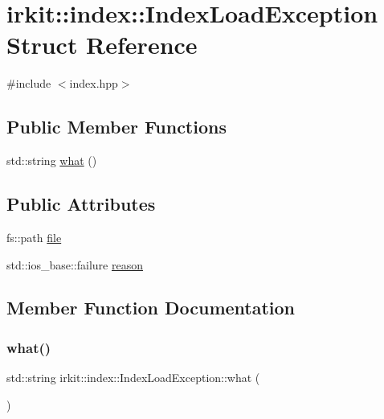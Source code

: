 \hypertarget{structirkit_1_1index_1_1IndexLoadException}{}\section{irkit\+:\+:index\+:\+:Index\+Load\+Exception Struct Reference}
\label{structirkit_1_1index_1_1IndexLoadException}


{\ttfamily \#include $<$index.\+hpp$>$}

\subsection*{Public Member Functions}
\begin{DoxyCompactItemize}
\item 
std\+::string \hyperlink{structirkit_1_1index_1_1IndexLoadException_a4fd8f3ce857b2e5040011564e34805f9}{what} ()
\end{DoxyCompactItemize}
\subsection*{Public Attributes}
\begin{DoxyCompactItemize}
\item 
fs\+::path \hyperlink{structirkit_1_1index_1_1IndexLoadException_a4df8f9192b0da363fac13aaebb0b4a3a}{file}
\item 
std\+::ios\+\_\+base\+::failure \hyperlink{structirkit_1_1index_1_1IndexLoadException_a843f66fcd135c9a396d41324c2817ab3}{reason}
\end{DoxyCompactItemize}


\subsection{Member Function Documentation}
\mbox{\label{structirkit_1_1index_1_1IndexLoadException_a4fd8f3ce857b2e5040011564e34805f9}} 
\subsubsection{\texorpdfstring{what()}{what()}}
{\footnotesize\ttfamily std\+::string irkit\+::index\+::\+Index\+Load\+Exception\+::what (\begin{DoxyParamCaption}{ }\end{DoxyParamCaption})\hspace{0.3cm}{\ttfamily [inline]}}



